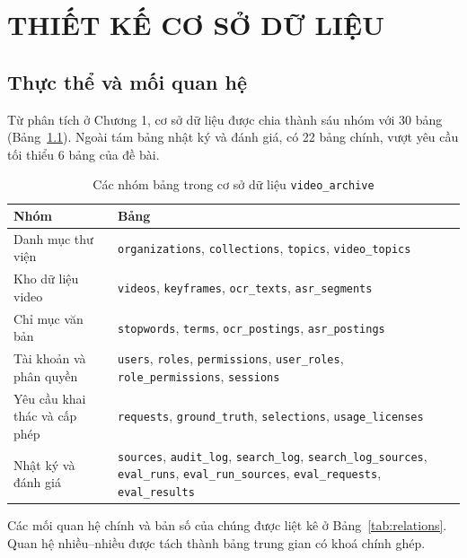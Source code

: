\chapter{THIẾT KẾ CƠ SỞ DỮ LIỆU}

\section{Thực thể và mối quan hệ}

Từ phân tích ở Chương 1, cơ sở dữ liệu được chia thành sáu nhóm với 30 bảng
(Bảng~\ref{tab:groups}). Ngoài tám bảng nhật ký và đánh giá, có 22 bảng chính, vượt yêu cầu
tối thiểu 6 bảng của đề bài.

\begin{table}[H]
\centering
\caption{Các nhóm bảng trong cơ sở dữ liệu \texttt{video\_archive}}
\label{tab:groups}
\renewcommand{\arraystretch}{1.2}
\begin{tabularx}{\textwidth}{>{\raggedright\arraybackslash}p{3.8cm} >{\raggedright\arraybackslash}X}
\toprule
\textbf{Nhóm} & \textbf{Bảng} \\
\midrule
Danh mục thư viện & \texttt{organizations}, \texttt{collections}, \texttt{topics}, \texttt{video\_topics} \\
Kho dữ liệu video & \texttt{videos}, \texttt{keyframes}, \texttt{ocr\_texts}, \texttt{asr\_segments} \\
Chỉ mục văn bản & \texttt{stopwords}, \texttt{terms}, \texttt{ocr\_postings}, \texttt{asr\_postings} \\
Tài khoản và phân quyền & \texttt{users}, \texttt{roles}, \texttt{permissions}, \texttt{user\_roles}, \texttt{role\_permissions}, \texttt{sessions} \\
Yêu cầu khai thác và cấp phép & \texttt{requests}, \texttt{ground\_truth}, \texttt{selections}, \texttt{usage\_licenses} \\
Nhật ký và đánh giá & \texttt{sources}, \texttt{audit\_log}, \texttt{search\_log}, \texttt{search\_log\_sources}, \texttt{eval\_runs}, \texttt{eval\_run\_sources}, \texttt{eval\_requests}, \texttt{eval\_results} \\
\bottomrule
\end{tabularx}
\end{table}

Các mối quan hệ chính và bản số của chúng được liệt kê ở Bảng~\ref{tab:relations}.
Quan hệ nhiều--nhiều được tách thành bảng trung gian có khoá chính ghép.


